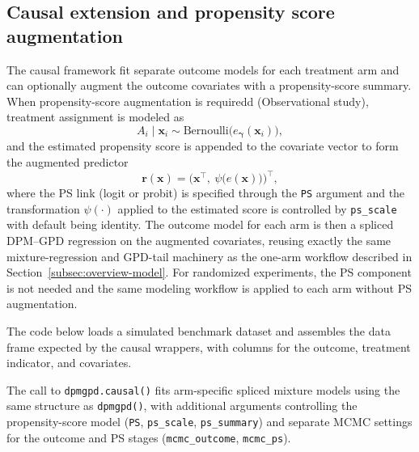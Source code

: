 \documentclass[article]{jss}\usepackage[]{graphicx}\usepackage[]{xcolor}
\DeclareRobustCommand{\code}[1]{\nolinkurl{#1}}
\begin{document}
\subsection{Causal extension and propensity score augmentation}
\label{subsec:overview-causal}

The causal framework fit separate outcome models for each treatment arm
and can optionally augment the outcome covariates with a
propensity-score summary. When propensity-score augmentation is
requiredd (Observational study), treatment assignment is modeled as
\begin{equation*}
A_i \mid \boldsymbol{x}_i \sim
\mathrm{Bernoulli}\big(e_{\boldsymbol{\gamma}}(\boldsymbol{x}_i)\big),
\end{equation*}
and the estimated propensity score is appended to the covariate vector
to form the augmented predictor
\begin{equation*}
\boldsymbol{r}(\boldsymbol{x})
=
\Big(\boldsymbol{x}^\top,\ \psi\big(\widehat e(\boldsymbol{x})\big)\Big)^\top,
\end{equation*}
where the PS link (logit or probit) is specified through the \code{PS}
argument and the transformation $\psi(\cdot)$ applied to the estimated
score is controlled by \code{ps\_scale} with default being identity.
The outcome model for each arm is then a spliced DPM--GPD regression on the augmented covariates,
reusing exactly the same mixture-regression and GPD-tail machinery as the one-arm workflow described in
Section~\ref{subsec:overview-model}. For
randomized experiments, the PS component is not needed and the same modeling workflow is applied to each arm without PS augmentation.

The code below loads a simulated benchmark dataset and assembles the
data frame expected by the causal wrappers, with columns for the
outcome, treatment indicator, and covariates.



The call to \code{dpmgpd.causal()} fits arm-specific spliced mixture
models using the same structure as \code{dpmgpd()}, with
additional arguments controlling the propensity-score model (\code{PS},
\code{ps\_scale}, \code{ps\_summary}) and separate MCMC settings for
the outcome and PS stages (\code{mcmc\_outcome}, \code{mcmc\_ps}).
\end{document}
